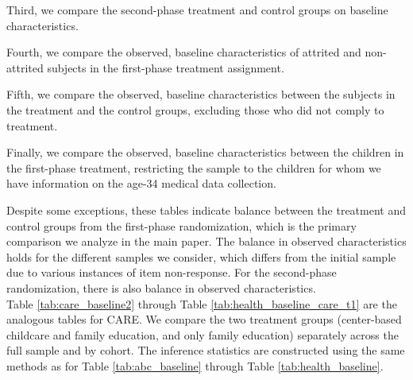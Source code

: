 

\noindent Third, we compare the second-phase treatment and control groups on baseline characteristics.



\noindent Fourth, we compare the observed, baseline characteristics of attrited and non-attrited subjects in the first-phase treatment assignment.



\noindent Fifth, we compare the observed, baseline characteristics between the subjects in the treatment and the control groups, excluding those who did not comply to treatment.

\noindent Finally, we compare the observed, baseline characteristics between the children in the first-phase treatment, restricting the sample to the children for whom we have information on the age-34 medical data collection.



\noindent Despite some exceptions, these tables indicate balance between the treatment and control groups from the first-phase randomization, which is the primary comparison we analyze in the main paper. The balance in observed characteristics holds for the different samples we consider, which differs from the initial sample due to various instances of item non-response. For the second-phase randomization, there is also balance in observed characteristics. \\

\noindent Table \ref{tab:care_baseline2} through Table \ref{tab:health_baseline_care_t1} are the analogous tables for CARE. We compare the two treatment groups (center-based childcare and family education, and only family education) separately across the full sample and by cohort. The inference statistics are constructed using the same methods as for Table \ref{tab:abc_baseline} through Table \ref{tab:health_baseline}. \\

